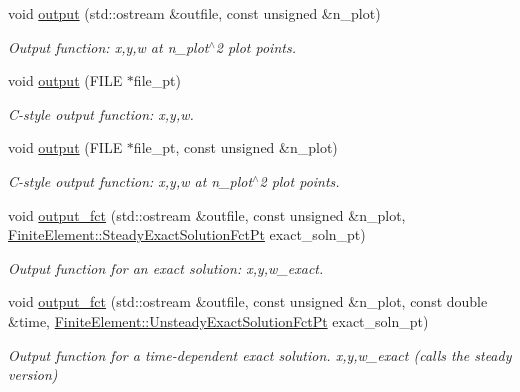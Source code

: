 \begin{DoxyCompactItemize}
void \hyperlink{classoomph_1_1TFoepplvonKarmanElement_abd3241a32dacbf790074198c3c30a8c1}{output} (std\+::ostream \&outfile, const unsigned \&n\+\_\+plot)
\begin{DoxyCompactList}\small\item\em Output function\+: x,y,w at n\+\_\+plot$^\wedge$2 plot points. \end{DoxyCompactList}\item 
void \hyperlink{classoomph_1_1TFoepplvonKarmanElement_ad6676ce8249127f37757d46b94cd1407}{output} (F\+I\+LE $\ast$file\+\_\+pt)
\begin{DoxyCompactList}\small\item\em C-\/style output function\+: x,y,w. \end{DoxyCompactList}\item 
void \hyperlink{classoomph_1_1TFoepplvonKarmanElement_ac3899c4e4e2ae477e5e5afec72ae4730}{output} (F\+I\+LE $\ast$file\+\_\+pt, const unsigned \&n\+\_\+plot)
\begin{DoxyCompactList}\small\item\em C-\/style output function\+: x,y,w at n\+\_\+plot$^\wedge$2 plot points. \end{DoxyCompactList}\item 
void \hyperlink{classoomph_1_1TFoepplvonKarmanElement_a8b321da1c5d766fc40ee502b82c6f47d}{output\+\_\+fct} (std\+::ostream \&outfile, const unsigned \&n\+\_\+plot, \hyperlink{classoomph_1_1FiniteElement_a690fd33af26cc3e84f39bba6d5a85202}{Finite\+Element\+::\+Steady\+Exact\+Solution\+Fct\+Pt} exact\+\_\+soln\+\_\+pt)
\begin{DoxyCompactList}\small\item\em Output function for an exact solution\+: x,y,w\+\_\+exact. \end{DoxyCompactList}\item 
void \hyperlink{classoomph_1_1TFoepplvonKarmanElement_a742ba8001f20e4c5237d4474c9f1a67b}{output\+\_\+fct} (std\+::ostream \&outfile, const unsigned \&n\+\_\+plot, const double \&time, \hyperlink{classoomph_1_1FiniteElement_ad4ecf2b61b158a4b4d351a60d23c633e}{Finite\+Element\+::\+Unsteady\+Exact\+Solution\+Fct\+Pt} exact\+\_\+soln\+\_\+pt)
\begin{DoxyCompactList}\small\item\em Output function for a time-\/dependent exact solution. x,y,w\+\_\+exact (calls the steady version) \end{DoxyCompactList}\end{DoxyCompactItemize}
